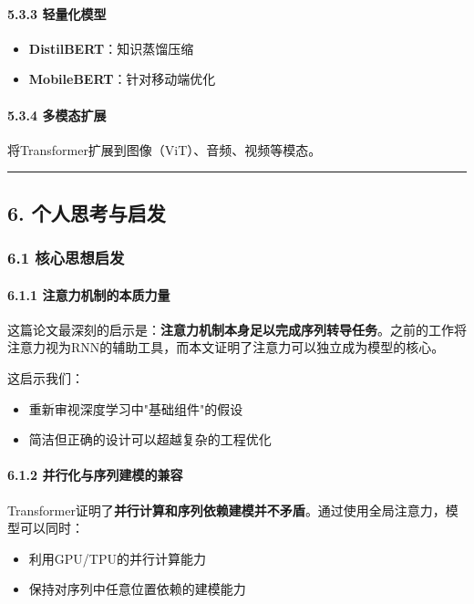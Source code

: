 \documentclass[11pt,a4paper]{article}
\begin{document}
\paragraph{5.3.3 轻量化模型}

\begin{itemize}
  \item \textbf{DistilBERT}：知识蒸馏压缩
  \item \textbf{MobileBERT}：针对移动端优化
\end{itemize}

\paragraph{5.3.4 多模态扩展}

将Transformer扩展到图像（ViT）、音频、视频等模态。

\vspace{0.5em}\noindent\rule{\textwidth}{0.4pt}\vspace{0.5em}

\subsection*{6. 个人思考与启发}

\subsubsection*{6.1 核心思想启发}

\paragraph{6.1.1 注意力机制的本质力量}

这篇论文最深刻的启示是：\textbf{注意力机制本身足以完成序列转导任务}。之前的工作将注意力视为RNN的辅助工具，而本文证明了注意力可以独立成为模型的核心。

这启示我们：
\begin{itemize}
  \item 重新审视深度学习中"基础组件"的假设
  \item 简洁但正确的设计可以超越复杂的工程优化
\end{itemize}

\paragraph{6.1.2 并行化与序列建模的兼容}

Transformer证明了\textbf{并行计算和序列依赖建模并不矛盾}。通过使用全局注意力，模型可以同时：
\begin{itemize}
  \item 利用GPU/TPU的并行计算能力
  \item 保持对序列中任意位置依赖的建模能力
\end{itemize}
\end{document}
